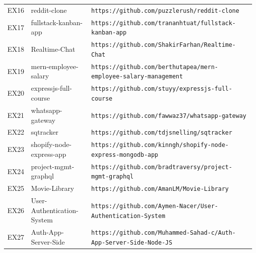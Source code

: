\begin{table}[H]
\begin{tabular}{p{} p{} p{}}
EX16 & reddit-clone                  & {\small\nolinkurl{https://github.com/puzzlerush/reddit-clone}} \\
EX17 & fullstack-kanban-app          & {\small\nolinkurl{https://github.com/trananhtuat/fullstack-kanban-app}} \\
EX18 & Realtime-Chat                 & {\small\nolinkurl{https://github.com/ShakirFarhan/Realtime-Chat}} \\
EX19 & mern-employee-salary          & {\small\nolinkurl{https://github.com/berthutapea/mern-employee-salary-management}} \\
EX20 & expressjs-full-course         & {\small\nolinkurl{https://github.com/stuyy/expressjs-full-course}} \\
EX21 & whatsapp-gateway              & {\small\nolinkurl{https://github.com/fawwaz37/whatsapp-gateway}} \\
EX22 & sqtracker                     & {\small\nolinkurl{https://github.com/tdjsnelling/sqtracker}} \\
EX23 & shopify-node-express-app      & {\small\nolinkurl{https://github.com/kinngh/shopify-node-express-mongodb-app}} \\
EX24 & project-mgmt-graphql          & {\small\nolinkurl{https://github.com/bradtraversy/project-mgmt-graphql}} \\
EX25 & Movie-Library                 & {\small\nolinkurl{https://github.com/AmanLM/Movie-Library}} \\
EX26 & User-Authentication-System    & {\small\nolinkurl{https://github.com/Aymen-Nacer/User-Authentication-System}} \\
EX27 & Auth-App-Server-Side          & {\small\nolinkurl{https://github.com/Muhammed-Sahad-c/Auth-App-Server-Side-Node-JS}} \\
\bottomrule
\end{tabular}
\end{table}
